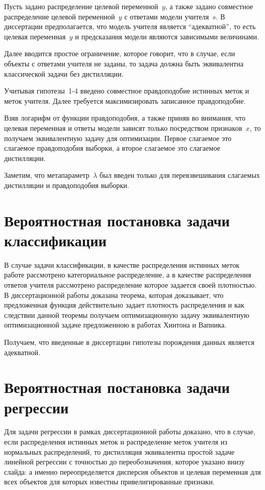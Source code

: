 \documentclass[10pt, twoside]{article}
\begin{document}
Пусть задано распределение целевой переменной~$y$, а также задано совместное распределение целевой переменной~$y$ с ответами модели учителя~$s$. В диссертации предполагается, что модель учителя является ``адекватной'', то есть целевая переменная~$y$ и предсказания модели являются зависимыми величинами. 

Далее вводится простое ограничение, которое говорит, что в случае, если объекты с ответами учителя не заданы, то задача должна быть эквивалентна классической задачи без дистилляции.

Учитывая гипотезы~1-4 введено совместное правдоподобие истинных меток и меток учителя. Далее требуется максимизировать записанное правдоподобие. 

Взяв логарифм от функции правдоподобия, а также приняв во внимания, что целевая переменная и ответы модели зависят только посредством признаков~$x$, то получаем эквивалентную задачу для оптимизации. Первое слагаемое это слагаемое правдоподобия выборки, а второе слагаемое это слагаемое дистилляции.

Заметим, что метапараметр~$\lambda$ был введен только для перевзвешивания слагаемых дистилляции и правдоподобия выборки.

\section{Вероятностная постановка задачи классификации}
В случае задачи классификации, в качестве распределения истинных меток  работе рассмотрено категориальное распределение, а в качестве распределения ответов учителя рассмотрено распределение которое задается своей плотностью.
В диссертационной работы доказана теорема, которая доказывает, что предложенная функция действительно задает плотность распределения и как следствии данной теоремы получаем оптимизационную задачу эквивалентную оптимизационной задаче предложенною в работах Хинтона и Вапника.

Получаем, что введенные в диссертации гипотезы порождения данных является адекватной.

\section{Вероятностная постановка задачи регрессии}

Для задачи регрессии в рамках диссертационной работы доказано, что в случае, если распределения истинных меток и распределение меток учителя из нормальных распределений, то дистилляция эквивалентна простой задаче линейной регрессии с точностью до переобозначения, которое указано внизу слайда: а именно переопределяется дисперсия объектов и целевая переменная для всех объектов для которых известны привелигированные признаки.
\end{document}
